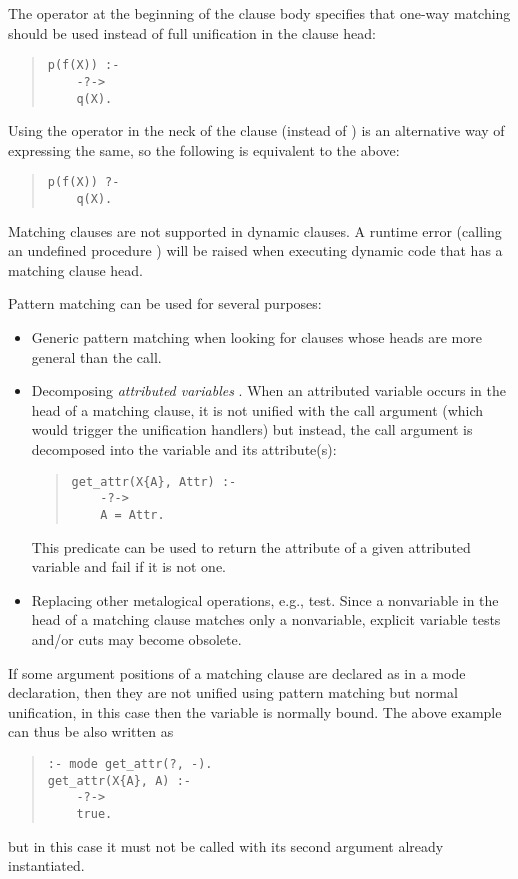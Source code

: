 The operator  at the beginning of the clause
body specifies that one-way matching should be used
instead of full unification in the clause head:
\begin{quote}
\begin{verbatim}
p(f(X)) :-
    -?->
    q(X).
\end{verbatim}
\end{quote}
Using the  operator in the neck of the clause (instead of
\notationidx{:-}) is an alternative way of expressing the same, so the following
is equivalent to the above:
\begin{quote}
\begin{verbatim}
p(f(X)) ?-
    q(X).
\end{verbatim}
\end{quote}

Matching clauses are not supported in dynamic clauses. A runtime error
(calling an undefined procedure ) will be raised
when
executing dynamic code that has a matching clause head.

Pattern matching can be used for several purposes:
\begin{itemize}
\item Generic pattern matching when looking for clauses
whose heads are more general than the call.

\item Decomposing {\it attributed variables} \cite{eclipseext}.
When an attributed variable occurs in the head of a matching clause,
it is not unified with the call argument (which would trigger
the unification handlers) but instead, the call argument
is decomposed into the variable and its attribute(s):
\begin{quote}
\begin{verbatim}
get_attr(X{A}, Attr) :-
    -?->
    A = Attr.
\end{verbatim}
\end{quote}
This predicate can be used to return the attribute of a given
attributed variable and fail if it is not one.

\item Replacing other metalogical operations,
e.g., 
test. Since a nonvariable in the head of a matching clause
matches only a nonvariable, explicit variable tests and/or cuts
may become obsolete.
\end{itemize}

If some argument positions of a matching clause are declared
as  in a mode declaration, then they are not
unified using pattern matching but normal unification,
in this case then the variable is normally bound.
The above example can thus be also written as
\begin{quote}
\begin{verbatim}
:- mode get_attr(?, -).
get_attr(X{A}, A) :-
    -?->
    true.
\end{verbatim}
\end{quote}
but in this case it must not be called with its second argument
already instantiated.


